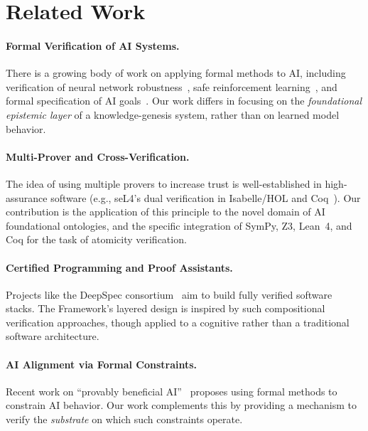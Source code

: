 \newpage
\section{Related Work}

\paragraph{Formal Verification of AI Systems.}
There is a growing body of work on applying formal methods to AI, including verification of neural network robustness~\cite{katz2017reluplex,wang2023alphaverus}, safe reinforcement learning~\cite{fulton2018safe}, and formal specification of AI goals~\cite{russell2019human}. Our work differs in focusing on the \textit{foundational epistemic layer} of a knowledge-genesis system, rather than on learned model behavior.

\paragraph{Multi-Prover and Cross-Verification.}
The idea of using multiple provers to increase trust is well-established in high-assurance software (e.g., seL4's dual verification in Isabelle/HOL and Coq~\cite{klein2009sel4}). Our contribution is the application of this principle to the novel domain of AI foundational ontologies, and the specific integration of SymPy, Z3, Lean~4, and Coq for the task of atomicity verification.

\paragraph{Certified Programming and Proof Assistants.}
Projects like the DeepSpec consortium~\cite{deepspec} aim to build fully verified software stacks. The \Apeiron{} Framework's layered design is inspired by such compositional verification approaches, though applied to a cognitive rather than a traditional software architecture.

\paragraph{AI Alignment via Formal Constraints.}
Recent work on ``provably beneficial AI''~\cite{everitt2021provably} proposes using formal methods to constrain AI behavior. Our work complements this by providing a mechanism to verify the \textit{substrate} on which such constraints operate.